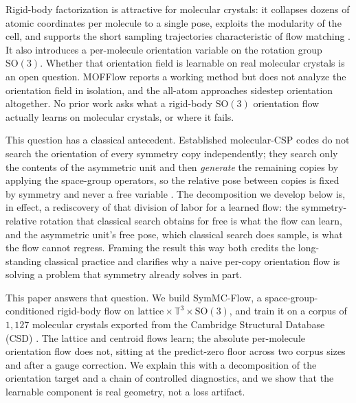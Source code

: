 \documentclass[10pt]{article}
\begin{document}
Rigid-body factorization is attractive for molecular crystals: it collapses
dozens of atomic coordinates per molecule to a single pose, exploits the
modularity of the cell, and supports the short sampling trajectories
characteristic of flow matching \citep{lipman2023flowmatching,chen2024riemannian}.
It also introduces a per-molecule orientation variable on the rotation group
$\mathrm{SO}(3)$. Whether that orientation field is learnable on real molecular
crystals is an open question. MOFFlow reports a working method but does not
analyze the orientation field in isolation, and the all-atom approaches sidestep
orientation altogether. No prior work asks what a rigid-body $\mathrm{SO}(3)$
orientation flow actually learns on molecular crystals, or where it fails.

This question has a classical antecedent. Established molecular-CSP codes do not
search the orientation of every symmetry copy independently; they search only
the contents of the asymmetric unit and then \emph{generate} the remaining
copies by applying the space-group operators, so the relative pose between
copies is fixed by symmetry and never a free
variable \citep{price2023blindtest7,obrien2021dataefficient}. The decomposition
we develop below is, in effect, a rediscovery of that division of labor for a
learned flow: the symmetry-relative rotation that classical search obtains for
free is what the flow can learn, and the asymmetric unit's free pose, which
classical search does sample, is what the flow cannot regress. Framing the
result this way both credits the long-standing classical practice and clarifies
why a naive per-copy orientation flow is solving a problem that symmetry already
solves in part.

This paper answers that question. We build SymMC-Flow, a
space-group-conditioned rigid-body flow on
$\text{lattice}\times\mathbb{T}^3\times\mathrm{SO}(3)$, and train it on a
corpus of $1{,}127$ molecular crystals exported from the Cambridge Structural
Database (CSD) \citep{groom2016csd}. The lattice and centroid flows learn; the
absolute per-molecule
orientation flow does not, sitting at the predict-zero floor across two corpus
sizes and after a gauge correction. We explain this with a decomposition of the
orientation target and a chain of controlled diagnostics, and we show that the
learnable component is real geometry, not a loss artifact.
\end{document}
